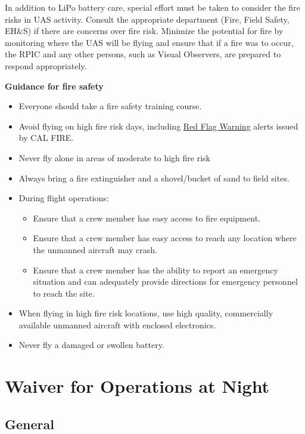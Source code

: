 \documentclass[
]{book}
\providecommand{\tightlist}{%
  \setlength{\itemsep}{0pt}\setlength{\parskip}{0pt}}
\begin{document}
In addition to LiPo battery care, special effort must be taken to consider the fire risks in UAS activity. Consult the appropriate department (Fire, Field Safety, EH\&S) if there are concerns over fire risk. Minimize the potential for fire by monitoring where the UAS will be flying and ensure that if a fire was to occur, the RPIC and any other persons, such as Visual Observers, are prepared to respond appropriately.

\textbf{Guidance for fire safety}

\begin{itemize}
\item
  Everyone should take a fire safety training course.
\item
  Avoid flying on high fire risk days, including \href{https://www.fire.ca.gov/programs/communications/red-flag-warnings-fire-weather-watches/}{Red Flag Warning} alerts issued by CAL FIRE.
\item
  Never fly alone in areas of moderate to high fire risk
\item
  Always bring a fire extinguisher and a shovel/bucket of sand to field sites.
\item
  During flight operations:

  \begin{itemize}
  \tightlist
  \item
    Ensure that a crew member has easy access to fire equipment.
  \item
    Ensure that a crew member has easy access to reach any location where the unmanned aircraft may crash.
  \item
    Ensure that a crew member has the ability to report an emergency situation and can adequately provide directions for emergency personnel to reach the site.
  \end{itemize}
\item
  When flying in high fire risk locations, use high quality, commercially available unmanned aircraft with enclosed electronics.
\item
  Never fly a damaged or swollen battery.
\end{itemize}

\hypertarget{ch-part29waiver}{%
\chapter{Waiver for Operations at Night}\label{ch-part29waiver}}

\hypertarget{s29-gen}{%
\section{General}\label{s29-gen}}
\end{document}
